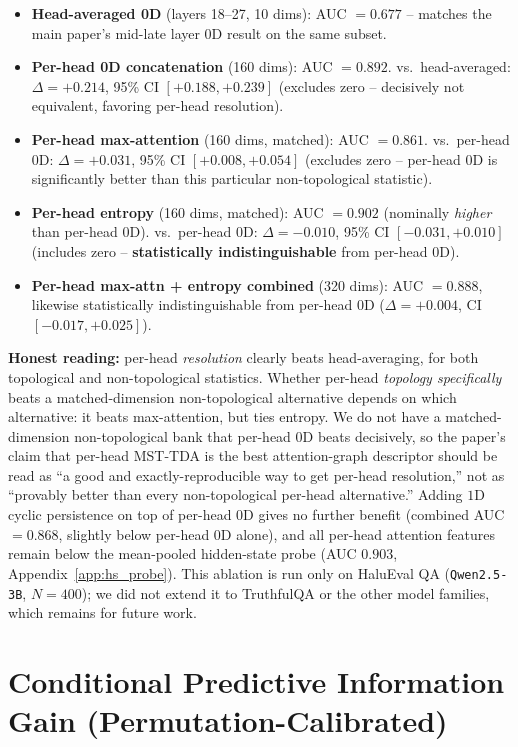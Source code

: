\documentclass{article}
\begin{document}
\begin{itemize}
  \item \textbf{Head-averaged 0D} (layers 18--27, 10 dims): AUC $= 0.677$ -- matches the main paper's mid-late layer 0D result on the same subset.
  \item \textbf{Per-head 0D concatenation} (160 dims): AUC $= 0.892$. vs.\ head-averaged: $\Delta=+0.214$, 95\% CI $[+0.188,+0.239]$ (excludes zero -- decisively not equivalent, favoring per-head resolution).
  \item \textbf{Per-head max-attention} (160 dims, matched): AUC $= 0.861$. vs.\ per-head 0D: $\Delta=+0.031$, 95\% CI $[+0.008,+0.054]$ (excludes zero -- per-head $0$D is significantly better than this particular non-topological statistic).
  \item \textbf{Per-head entropy} (160 dims, matched): AUC $= \mathbf{0.902}$ (nominally \emph{higher} than per-head $0$D). vs.\ per-head 0D: $\Delta=-0.010$, 95\% CI $[-0.031,+0.010]$ (includes zero -- \textbf{statistically indistinguishable} from per-head $0$D).
  \item \textbf{Per-head max-attn + entropy combined} (320 dims): AUC $= 0.888$, likewise statistically indistinguishable from per-head $0$D ($\Delta=+0.004$, CI $[-0.017,+0.025]$).
\end{itemize}

\textbf{Honest reading:} per-head \emph{resolution} clearly beats head-averaging, for both topological and non-topological statistics. Whether per-head \emph{topology specifically} beats a matched-dimension non-topological alternative depends on which alternative: it beats max-attention, but ties entropy. We do not have a matched-dimension non-topological bank that per-head $0$D beats decisively, so the paper's claim that per-head MST-TDA is the best attention-graph descriptor should be read as ``a good and exactly-reproducible way to get per-head resolution,'' not as ``provably better than every non-topological per-head alternative.'' Adding $1$D cyclic persistence on top of per-head $0$D gives no further benefit (combined AUC $= 0.868$, slightly below per-head $0$D alone), and all per-head attention features remain below the mean-pooled hidden-state probe (AUC $0.903$, Appendix~\ref{app:hs_probe}). This ablation is run only on HaluEval QA (\texttt{Qwen2.5-3B}, $N{=}400$); we did not extend it to TruthfulQA or the other model families, which remains for future work.


\section{Conditional Predictive Information Gain (Permutation-Calibrated)}
\label{app:mi}
\end{document}
